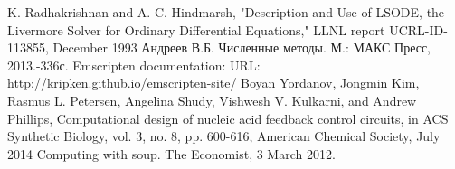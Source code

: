 \documentclass[oneside,final,14pt]{extreport}
\begin{document}
\begin{thebibliography}{00}
K. Radhakrishnan and A. C. Hindmarsh, "Description and Use of 
LSODE, the Livermore Solver for Ordinary 
Differential Equations," LLNL report UCRL-ID-113855, December 1993
Андреев В.Б. Численные методы. М.: МАКС Пресс, 2013.-336с.
Emscripten documentation: URL: http://kripken.github.io/emscripten-site/
Boyan Yordanov, Jongmin Kim, Rasmus L. Petersen, Angelina Shudy, Vishwesh V. Kulkarni, and Andrew Phillips, Computational design of nucleic acid feedback control circuits, in ACS Synthetic Biology, vol. 3, no. 8, pp. 600-616, American Chemical Society, July 2014
Computing with soup. The Economist, 3 March 2012.
\end{thebibliography}
\end{document}
